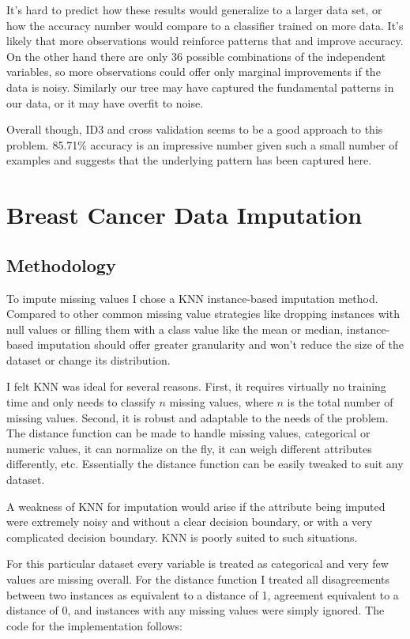 \documentclass[11pt, letterpaper]{report}
\begin{document}
It's hard to predict how these results would generalize to a larger data set, or how the accuracy number would compare to a classifier trained on more data. It's likely that more observations would reinforce patterns that and improve accuracy. On the other hand there are only 36 possible combinations of the independent variables, so more observations could offer only marginal improvements if the data is noisy. Similarly our tree may have captured the fundamental patterns in our data, or it may have overfit to noise.

Overall though, ID3 and cross validation seems to be a good approach to this problem. 85.71\% accuracy is an impressive number given such a small number of examples and suggests that the underlying pattern has been captured here.

\section{Breast Cancer Data Imputation}

\subsection{Methodology}

To impute missing values I chose a KNN instance-based imputation method. Compared to other common missing value strategies like dropping instances with null values or filling them with a class value like the mean or median, instance-based imputation should offer greater granularity and won't reduce the size of the dataset or change its distribution.

I felt KNN was ideal for several reasons. First, it requires virtually no training time and only needs to classify $n$ missing values, where $n$ is the total number of missing values. Second, it is robust and adaptable to the needs of the problem. The distance function can be made to handle missing values, categorical or numeric values, it can normalize on the fly, it can weigh different attributes differently, etc. Essentially the distance function can be easily tweaked to suit any dataset.

A weakness of KNN for imputation would arise if the attribute being imputed were extremely noisy and without a clear decision boundary, or with a very complicated decision boundary. KNN is poorly suited to such situations.

For this particular dataset every variable is treated as categorical and very few values are missing overall. For the distance function I treated all disagreements between two instances as equivalent to a distance of 1, agreement equivalent to a distance of 0, and instances with any missing values were simply ignored. The code for the implementation follows:
\end{document}
